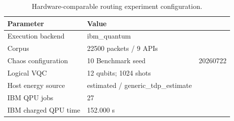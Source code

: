 \begin{table}[htbp]
\caption{Hardware-comparable routing experiment configuration.}
\label{tab:routing-experiment-configuration}
\centering
\begin{tabular}{ll}
\hline
Parameter & Value \\
\hline
Execution backend & ibm\_quantum \\
Corpus & 22500 packets / 9 APIs \\
Chaos configuration & 10%
Benchmark seed & 20260722 \\
Logical VQC & 12 qubits; 1024 shots \\
Host energy source & estimated / generic\_tdp\_estimate \\
IBM QPU jobs & 27 \\
IBM charged QPU time & 152.000 s \\
\hline
\end{tabular}
\end{table}
